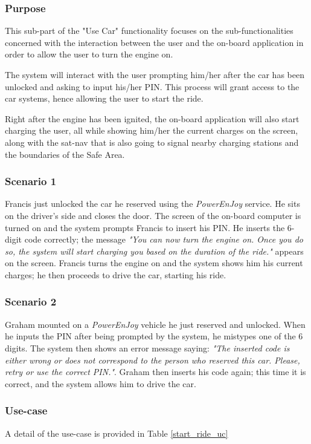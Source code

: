 \subsubsection{Purpose}
This sub-part of the "Use Car" functionality focuses on the sub-functionalities concerned with the interaction between the user and the on-board application in order to allow the user to turn the engine on.

The system will interact with the user prompting him/her after the car has been unlocked and asking to input his/her PIN. This process will grant access to the car systems, hence allowing the user to start the ride.

Right after the engine has been ignited, the on-board application will also start charging the user, all while showing him/her the current charges on the screen, along with the sat-nav that is also going to signal nearby charging stations and the boundaries of the Safe Area.

\subsubsection{Scenario 1}
Francis just unlocked the car he reserved using the \emph{PowerEnJoy} service. He sits on the driver's side and closes the door. The screen of the on-board computer is turned on and the system prompts Francis to insert his PIN. He inserts the 6-digit code correctly; the message \emph{"You can now turn the engine on. Once you do so, the system will start charging you based on the duration of the ride."} appears on the screen. Francis turns the engine on and the system shows him his current charges; he then proceeds to drive the car, starting his ride.

\subsubsection{Scenario 2}
Graham mounted on a \emph{PowerEnJoy} vehicle he just reserved and unlocked. When he inputs the PIN after being prompted by the system, he mistypes one of the 6 digits. The system then shows an error message saying: \emph{"The inserted code is either wrong or does not correspond to the person who reserved this car. Please, retry or use the correct PIN."}. Graham then inserts his code again; this time it is correct, and the system allows him to drive the car.

\subsubsection{Use-case}
A detail of the use-case is provided in Table \ref{start_ride_uc}

